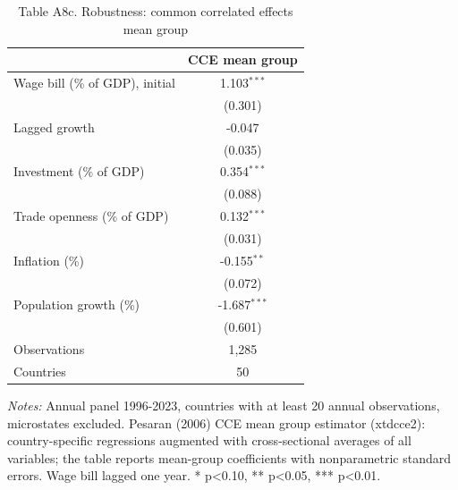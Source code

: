 \begin{table}[htbp]\centering\footnotesize
\providecommand{\sym}[1]{\ensuremath{^{#1}}}
\caption{Table A8c. Robustness: common correlated effects mean group}\label{tab:TableA8c_robustness_cce}
\begin{tabular}{l*{1}{c}}
\toprule
 & CCE mean group \\
\midrule
Wage bill (\% of GDP), initial & 1.103\sym{***} \\
 & (0.301) \\
Lagged growth & -0.047 \\
 & (0.035) \\
Investment (\% of GDP) & 0.354\sym{***} \\
 & (0.088) \\
Trade openness (\% of GDP) & 0.132\sym{***} \\
 & (0.031) \\
Inflation (\%) & -0.155\sym{**} \\
 & (0.072) \\
Population growth (\%) & -1.687\sym{***} \\
 & (0.601) \\
\midrule
Observations & 1,285 \\
Countries & 50 \\
\bottomrule
\end{tabular}
\begin{minipage}{0.95\linewidth}\vspace{4pt}\scriptsize \textit{Notes:} Annual panel 1996-2023, countries with at least 20 annual observations, microstates excluded. Pesaran (2006) CCE mean group estimator (xtdcce2): country-specific regressions augmented with cross-sectional averages of all variables; the table reports mean-group coefficients with nonparametric standard errors. Wage bill lagged one year. * p<0.10, ** p<0.05, *** p<0.01.\end{minipage}
\end{table}
